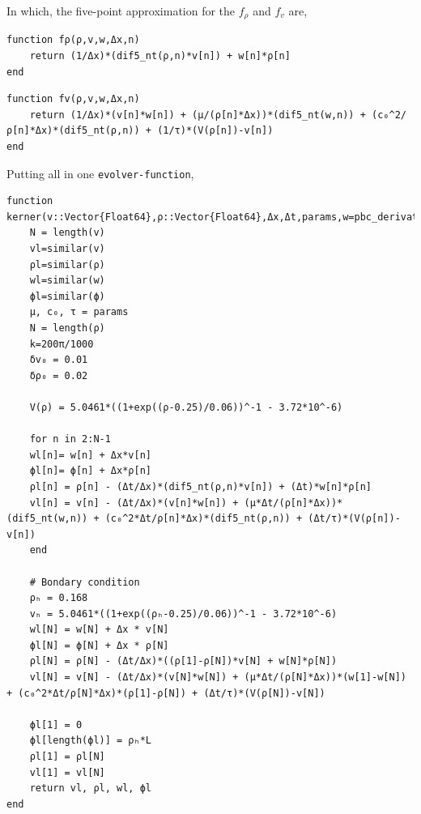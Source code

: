 \documentclass[11pt]{article}
\begin{document}
\begin{enumerate}
In which, the five-point approximation for the \(f_{\rho}\) and \(f_v\) are,

\begin{verbatim}
function fρ(ρ,v,w,Δx,n)
    return (1/Δx)*(dif5_nt(ρ,n)*v[n]) + w[n]*ρ[n]
end
\end{verbatim}

\begin{verbatim}
function fv(ρ,v,w,Δx,n)
    return (1/Δx)*(v[n]*w[n]) + (μ/(ρ[n]*Δx))*(dif5_nt(w,n)) + (c₀^2/ρ[n]*Δx)*(dif5_nt(ρ,n)) + (1/τ)*(V(ρ[n])-v[n])
end
\end{verbatim}


Putting all in one \texttt{evolver-function},
\begin{verbatim}
function kerner(v::Vector{Float64},ρ::Vector{Float64},Δx,Δt,params,w=pbc_derivative(v,Δx),ϕ=pbc_derivative(ρ,Δx))
    N = length(v)
    vl=similar(v)
    ρl=similar(ρ)
    wl=similar(w)
    ϕl=similar(ϕ)
    μ, c₀, τ = params
    N = length(ρ)
    k=200π/1000
    δv₀ = 0.01
    δρ₀ = 0.02

    V(ρ) = 5.0461*((1+exp((ρ-0.25)/0.06))^-1 - 3.72*10^-6)

    for n in 2:N-1
	wl[n]= w[n] + Δx*v[n]
	ϕl[n]= ϕ[n] + Δx*ρ[n]
	ρl[n] = ρ[n] - (Δt/Δx)*(dif5_nt(ρ,n)*v[n]) + (Δt)*w[n]*ρ[n]
	vl[n] = v[n] - (Δt/Δx)*(v[n]*w[n]) + (μ*Δt/(ρ[n]*Δx))*(dif5_nt(w,n)) + (c₀^2*Δt/ρ[n]*Δx)*(dif5_nt(ρ,n)) + (Δt/τ)*(V(ρ[n])-v[n])
    end

    # Bondary condition
    ρₕ = 0.168
    vₕ = 5.0461*((1+exp((ρₕ-0.25)/0.06))^-1 - 3.72*10^-6)
    wl[N] = w[N] + Δx * v[N]
    ϕl[N] = ϕ[N] + Δx * ρ[N]
    ρl[N] = ρ[N] - (Δt/Δx)*((ρ[1]-ρ[N])*v[N] + w[N]*ρ[N])
    vl[N] = v[N] - (Δt/Δx)*(v[N]*w[N]) + (μ*Δt/(ρ[N]*Δx))*(w[1]-w[N]) + (c₀^2*Δt/ρ[N]*Δx)*(ρ[1]-ρ[N]) + (Δt/τ)*(V(ρ[N])-v[N])

    ϕl[1] = 0
    ϕl[length(ϕl)] = ρₕ*L
    ρl[1] = ρl[N]
    vl[1] = vl[N]
    return vl, ρl, wl, ϕl
end
\end{verbatim}
\end{enumerate}
\end{document}
